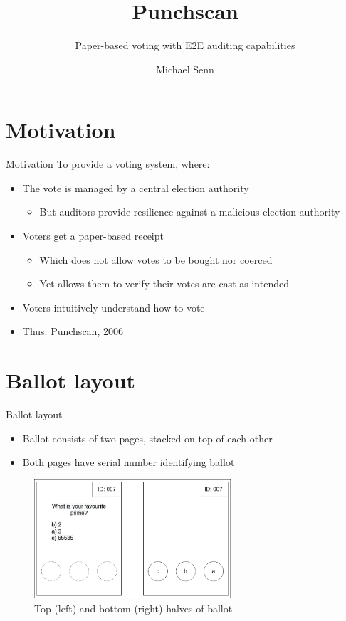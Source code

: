 \documentclass{beamer}
\title{Punchscan}
\subtitle{Paper-based voting with E2E auditing capabilities}
\author{Michael Senn}
\institute{Faculty of Science, University of Bern}
\date{\DTMusedate{presentation}}
\begin{document}
\maketitle

\section{Motivation}

\begin{frame}{Motivation}
	To provide a voting system, where:
	\begin{itemize}
		\item The vote is managed by a central election authority
			\begin{itemize}
				\item But auditors provide resilience against a malicious election authority
			\end{itemize}
		\item Voters get a paper-based receipt
			\begin{itemize}
				\item Which does not allow votes to be bought nor coerced
				\item Yet allows them to verify their votes are cast-as-intended
			\end{itemize}
		\item Voters intuitively understand how to vote
		\item Thus: Punchscan, 2006 \autocite{fisherPunchscanIntroductionSystem2006}
	\end{itemize}
\end{frame}

\section{Ballot layout}

\begin{frame}{Ballot layout}
	\begin{itemize}
		\item Ballot consists of two pages, stacked on top of each other
		\item Both pages have serial number identifying ballot
	\end{itemize}
	\begin{figure}
		\centering
		\includegraphics[width=0.65\textwidth]{../resources/high_level_ballot.drawio.png}
		\caption{Top (left) and bottom (right) halves of ballot}
	\end{figure}
\end{frame}
\end{document}
